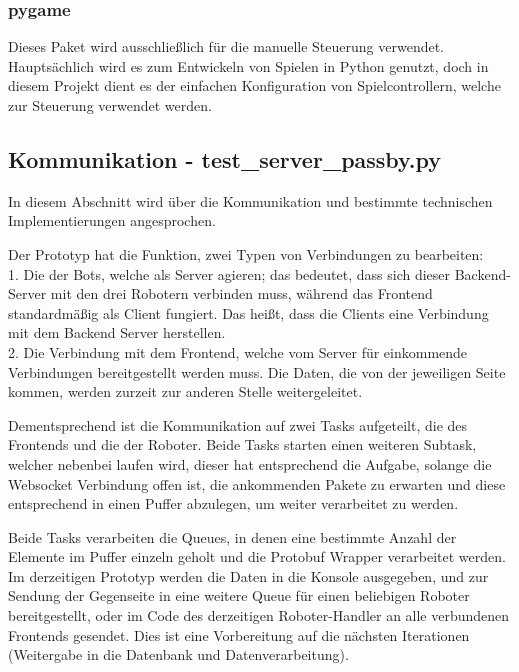 
\subsubsection{pygame}
Dieses Paket wird ausschließlich für die manuelle Steuerung verwendet.
%
Hauptsächlich wird es zum Entwickeln von Spielen in Python genutzt,
doch in diesem Projekt dient es der einfachen Konfiguration von Spielcontrollern,
welche zur Steuerung verwendet werden.

\subsection{Kommunikation - test\_server\_passby.py}
In diesem Abschnitt wird über die Kommunikation 
und bestimmte technischen Implementierungen angesprochen.

Der Prototyp hat die Funktion, zwei Typen von Verbindungen zu bearbeiten: \\
%
1. Die der Bots, welche als Server agieren; 
das bedeutet, 
dass sich dieser Backend-Server mit den drei Robotern verbinden muss, 
während das Frontend standardmäßig als Client fungiert. 
Das heißt, dass die Clients eine Verbindung mit dem Backend Server herstellen. \\
% 
2. Die Verbindung mit dem Frontend, 
welche vom Server für einkommende Verbindungen bereitgestellt werden muss.
% 
Die Daten, die von der jeweiligen Seite kommen, 
werden zurzeit zur anderen Stelle weitergeleitet.

Dementsprechend ist die Kommunikation auf zwei Tasks aufgeteilt,
die des Frontends und die der Roboter.
% 
Beide Tasks starten einen weiteren Subtask, welcher nebenbei laufen wird, 
dieser hat entsprechend die Aufgabe, 
solange die Websocket Verbindung offen ist,
die ankommenden Pakete zu erwarten 
und diese entsprechend in einen Puffer abzulegen, 
um weiter verarbeitet zu werden. 

Beide Tasks verarbeiten die Queues, 
in denen eine bestimmte Anzahl der Elemente im Puffer 
einzeln geholt und die Protobuf Wrapper verarbeitet werden.
% 
Im derzeitigen Prototyp werden die Daten in die Konsole ausgegeben,
und zur Sendung der Gegenseite in eine weitere Queue 
für einen beliebigen Roboter bereitgestellt, 
oder im Code des derzeitigen Roboter-Handler 
an alle verbundenen Frontends gesendet.
% 
Dies ist eine Vorbereitung auf die nächsten Iterationen 
(Weitergabe in die Datenbank und Datenverarbeitung).

